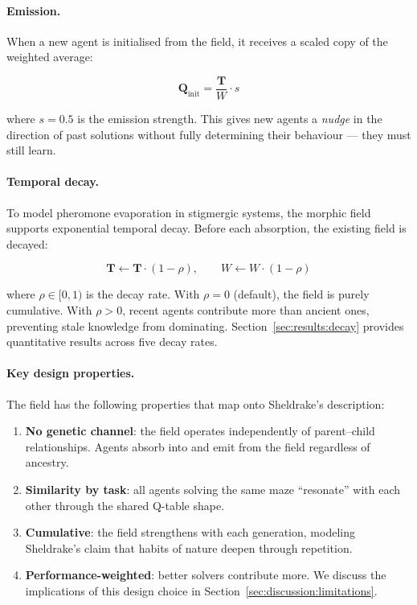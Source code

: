 \documentclass[twoside,11pt]{article}
\begin{document}
\paragraph{Emission.}
When a new agent is initialised from the field, it receives a scaled copy of
the weighted average:

\begin{equation}
\label{eq:emit}
\mathbf{Q}_{\text{init}} = \frac{\mathbf{T}}{W} \cdot s
\end{equation}

where $s = 0.5$ is the emission strength.  This gives new agents a
\emph{nudge} in the direction of past solutions without fully determining
their behaviour --- they must still learn.

\paragraph{Temporal decay.}
To model pheromone evaporation in stigmergic systems, the morphic field
supports exponential temporal decay.  Before each absorption, the existing
field is decayed:

\begin{equation}
\label{eq:decay}
\mathbf{T} \leftarrow \mathbf{T} \cdot (1 - \rho), \qquad
W \leftarrow W \cdot (1 - \rho)
\end{equation}

where $\rho \in [0, 1)$ is the decay rate.  With $\rho = 0$ (default), the
field is purely cumulative.  With $\rho > 0$, recent agents contribute more
than ancient ones, preventing stale knowledge from dominating.
Section~\ref{sec:results:decay} provides quantitative results across five
decay rates.

\paragraph{Key design properties.}
The field has the following properties that map onto Sheldrake's description:
\begin{enumerate}[leftmargin=2em]
    \item \textbf{No genetic channel}: the field operates independently of
          parent--child relationships.  Agents absorb into and emit from the
          field regardless of ancestry.
    \item \textbf{Similarity by task}: all agents solving the same maze
          ``resonate'' with each other through the shared Q-table shape.
    \item \textbf{Cumulative}: the field strengthens with each generation,
          modeling Sheldrake's claim that habits of nature deepen through
          repetition.
    \item \textbf{Performance-weighted}: better solvers contribute more.
          We discuss the implications of this design choice in
          Section~\ref{sec:discussion:limitations}.
\end{enumerate}
\end{document}
